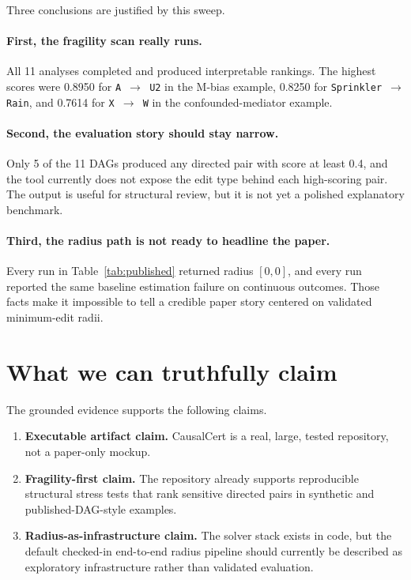 \documentclass[11pt]{article}
\begin{document}
Three conclusions are justified by this sweep.

\paragraph{First, the fragility scan really runs.}
All 11 analyses completed and produced interpretable rankings. The highest scores were 0.8950 for \texttt{A $\to$ U2} in the M-bias example, 0.8250 for \texttt{Sprinkler $\to$ Rain}, and 0.7614 for \texttt{X $\to$ W} in the confounded-mediator example.

\paragraph{Second, the evaluation story should stay narrow.}
Only 5 of the 11 DAGs produced any directed pair with score at least 0.4, and the tool currently does not expose the edit type behind each high-scoring pair. The output is useful for structural review, but it is not yet a polished explanatory benchmark.

\paragraph{Third, the radius path is not ready to headline the paper.}
Every run in Table~\ref{tab:published} returned radius $[0,0]$, and every run reported the same baseline estimation failure on continuous outcomes. Those facts make it impossible to tell a credible paper story centered on validated minimum-edit radii.

\section{What we can truthfully claim}

The grounded evidence supports the following claims.
\begin{enumerate}[leftmargin=*]
    \item \textbf{Executable artifact claim.} CausalCert is a real, large, tested repository, not a paper-only mockup.
    \item \textbf{Fragility-first claim.} The repository already supports reproducible structural stress tests that rank sensitive directed pairs in synthetic and published-DAG-style examples.
    \item \textbf{Radius-as-infrastructure claim.} The solver stack exists in code, but the default checked-in end-to-end radius pipeline should currently be described as exploratory infrastructure rather than validated evaluation.
\end{enumerate}
\end{document}
